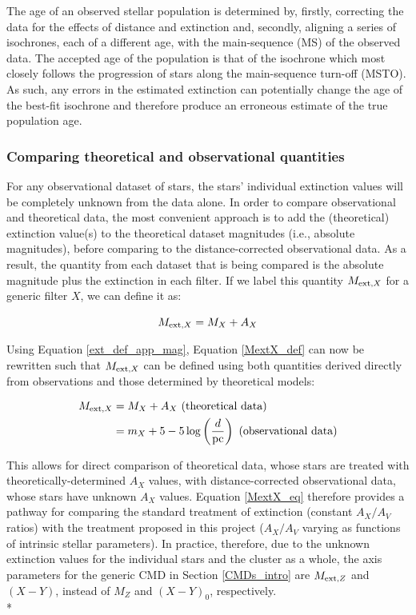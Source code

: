 \documentclass[12pt, a4paper]{report}
\begin{document}
The age of an observed stellar population is determined by, firstly, correcting the data for the effects of distance and extinction and, secondly, aligning a series of isochrones, each of a different age, with the main-sequence (MS) of the observed data. The accepted age of the population is that of the isochrone which most closely follows the progression of stars along the main-sequence turn-off (MSTO). As such, any errors in the estimated extinction can potentially change the age of the best-fit isochrone and therefore produce an erroneous estimate of the true population age.

\subsubsection{Comparing theoretical and observational quantities} \label{add_ext}
For any observational dataset of stars, the stars' individual extinction values will be completely unknown from the data alone. In order to compare observational and theoretical data, the most convenient approach is to add the (theoretical) extinction value(s) to the theoretical dataset magnitudes (i.e., absolute magnitudes), before comparing to the distance-corrected observational data. As a result, the quantity from each dataset that is being compared is the absolute magnitude plus the extinction in each filter. If we label this quantity $M_{\textnormal{ext},X}$ for a generic filter $X$, we can define it as:

\begin{equation}
M_{\textnormal{ext},X} = M_{X} + A_{X}
\label{MextX_def}
\end{equation}

Using Equation \ref{ext_def_app_mag}, Equation \ref{MextX_def} can now be rewritten such that $M_{\textnormal{ext},X}$ can be defined using both quantities derived directly from observations and those determined by theoretical models:

\begin{align}
\begin{split}
M_{\textnormal{ext},X} &= M_{X} + A_{X} \textnormal{ (theoretical data)}\\
 &= m_{X} + 5 - 5\log\left(\frac{d}{\textnormal{pc}}\right) \textnormal{ (observational data)}
\end{split}
\label{MextX_eq}
\end{align}

This allows for direct comparison of theoretical data, whose stars are treated with theoretically-determined $A_{X}$ values, with distance-corrected observational data, whose stars have unknown $A_{X}$ values. Equation \ref{MextX_eq} therefore provides a pathway for comparing the standard treatment of extinction (constant $A_{X}/A_{V}$ ratios) with the treatment proposed in this project ($A_{X}/A_{V}$ varying as functions of intrinsic stellar parameters). In practice, therefore, due to the unknown extinction values for the individual stars and the cluster as a whole, the axis parameters for the generic CMD in Section \ref{CMDs_intro} are $M_{\textnormal{ext},Z}$ and $(X-Y)$, instead of $M_{Z}$ and $(X-Y)_{0}$, respectively.\\*
\end{document}
